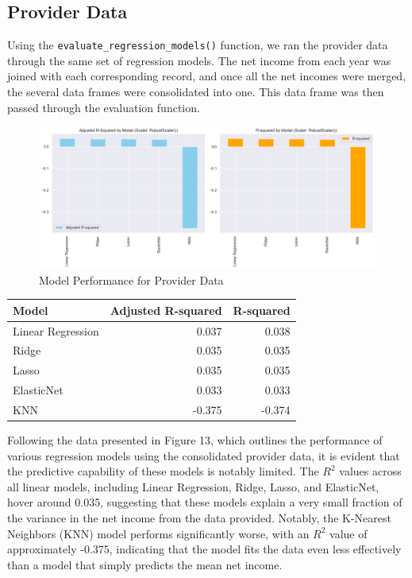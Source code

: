 \documentclass{article}
\theoremstyle{mytheoremstyle}
\theoremstyle{mytheoremstyle}
\theoremstyle{myproblemstyle}
\begin{document}
\pagebreak



\subsection{Provider Data}

Using the \texttt{evaluate\_regression\_models()} function, we ran the provider data through the same set of regression models. The net income from each year was joined with each corresponding record, and once all the net incomes were merged, the several data frames were consolidated into one. This data frame was then passed through the evaluation function. 

\begin{figure}[htbp]
\centering
\includegraphics[width=\linewidth]{Images/evalRegModelProviders.png}
\caption{Model Performance for Provider Data}
\label{fig:Robust Scaler Results}
\end{figure}

\begin{table}[ht]
\centering
\begin{tabular}{@{}lrr@{}}
\toprule
Model            & \multicolumn{1}{c}{Adjusted R-squared} & \multicolumn{1}{c}{R-squared} \\ 
\midrule
Linear Regression & 0.037 & 0.038\\
Ridge             & 0.035 & 0.035\\
Lasso             & 0.035 & 0.035\\
ElasticNet        & 0.033 & 0.033\\
KNN               & -0.375 & -0.374\\
\bottomrule
\end{tabular}
\label{tab:model_performance robust}
\end{table}

Following the data presented in Figure 13, which outlines the performance of various regression models using the consolidated provider data, it is evident that the predictive capability of these models is notably limited. The $R^2$ values across all linear models, including Linear Regression, Ridge, Lasso, and ElasticNet, hover around 0.035, suggesting that these models explain a very small fraction of the variance in the net income from the data provided. Notably, the K-Nearest Neighbors (KNN) model performs significantly worse, with an $R^2$ value of approximately -0.375, indicating that the model fits the data even less effectively than a model that simply predicts the mean net income.
\end{document}
